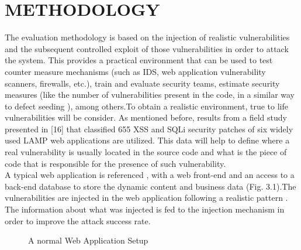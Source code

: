 \chapter{METHODOLOGY}\label{chp:chapter3}
\thispagestyle{fancy}
The evaluation methodology is based on the injection of realistic vulnerabilities and the subsequent controlled exploit of those
vulnerabilities in order to attack the system. This provides a practical environment that can be used to test
counter measure mechanisms (such as IDS, web application vulnerability scanners, firewalls, etc.), train and evaluate security teams, estimate security measures (like the
number of vulnerabilities present in the code, in a similar
way to defect seeding  \cite{12}), among others.To obtain a realistic environment, true
to life vulnerabilities will be consider. As mentioned before,
results from a field study presented in [16] that classified
655 XSS and SQLi security patches of six widely used
LAMP web applications are utilized. This data will help to define
where a real vulnerability is usually located in the source
code and what is the piece of code that is responsible for the
presence of such vulnerability.\\
\newline
A typical web application is referenced , with a web front-end and an access to a back-end database to store the dynamic content and business data (Fig. 3.1).The vulnerabilities are injected in the web application following a realistic pattern . The information
about what was injected is fed to the injection mechanism in
order to improve the attack success rate.


\begin{figure} [H]
\centering
{}
\caption{A normal Web Application Setup}
\label{fig:Fig1}
\end{figure}

